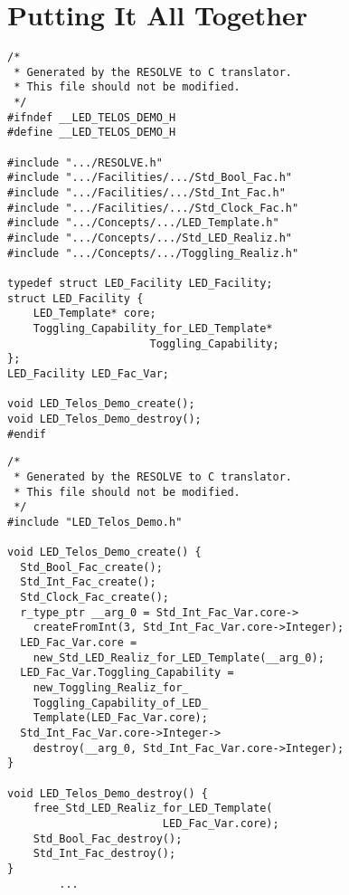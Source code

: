 \section{Putting It All Together}

\begin{figure*}
\begin{minipage}{0.4\textwidth}
\begin{verbatim}
/*
 * Generated by the RESOLVE to C translator. 
 * This file should not be modified.
 */
#ifndef __LED_TELOS_DEMO_H
#define __LED_TELOS_DEMO_H

#include ".../RESOLVE.h"
#include ".../Facilities/.../Std_Bool_Fac.h"
#include ".../Facilities/.../Std_Int_Fac.h"
#include ".../Facilities/.../Std_Clock_Fac.h"
#include ".../Concepts/.../LED_Template.h"
#include ".../Concepts/.../Std_LED_Realiz.h"
#include ".../Concepts/.../Toggling_Realiz.h"

typedef struct LED_Facility LED_Facility;
struct LED_Facility {
    LED_Template* core;
    Toggling_Capability_for_LED_Template* 
                      Toggling_Capability;
};
LED_Facility LED_Fac_Var;

void LED_Telos_Demo_create();
void LED_Telos_Demo_destroy();
#endif
\end{verbatim}
\end{minipage}
\hspace{1.5cm} 
\begin{minipage}{0.4\textwidth}
\begin{verbatim}
/*
 * Generated by the RESOLVE to C translator. 
 * This file should not be modified.
 */
#include "LED_Telos_Demo.h"

void LED_Telos_Demo_create() {
  Std_Bool_Fac_create();
  Std_Int_Fac_create();
  Std_Clock_Fac_create();
  r_type_ptr __arg_0 = Std_Int_Fac_Var.core->
    createFromInt(3, Std_Int_Fac_Var.core->Integer);
  LED_Fac_Var.core = 
    new_Std_LED_Realiz_for_LED_Template(__arg_0);
  LED_Fac_Var.Toggling_Capability = 
    new_Toggling_Realiz_for_
    Toggling_Capability_of_LED_
    Template(LED_Fac_Var.core);
  Std_Int_Fac_Var.core->Integer->
    destroy(__arg_0, Std_Int_Fac_Var.core->Integer);
}

void LED_Telos_Demo_destroy() {
    free_Std_LED_Realiz_for_LED_Template(
    				    LED_Fac_Var.core);
    Std_Bool_Fac_destroy();
    Std_Int_Fac_destroy();
}
        ...
\end{verbatim}
\end{minipage}
\label{fig:demo}
\end{figure*}

